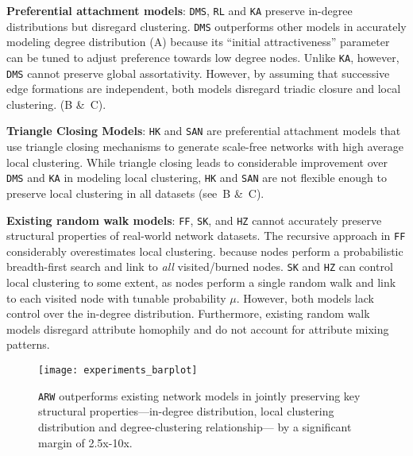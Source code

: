 \textbf{Preferential attachment models}: \texttt{DMS}, \texttt{RL}
and \texttt{KA} preserve in-degree distributions but disregard
clustering. \texttt{DMS} outperforms other models in accurately modeling
degree distribution (A) because its ``initial attractiveness''
parameter can be tuned to adjust preference towards low degree nodes. Unlike \texttt{KA}, however,
\texttt{DMS} cannot preserve global assortativity.
However, by assuming that successive edge formations are independent, both models disregard
triadic closure and local clustering. (B \&~C).

\textbf{Triangle Closing Models}: \texttt{HK} and \texttt{SAN} are preferential attachment models
that use triangle closing mechanisms to generate scale-free networks with high average
local clustering.
While triangle closing leads to considerable improvement over \texttt{DMS}
and \texttt{KA} in modeling local clustering, \texttt{HK} and \texttt{SAN} are not flexible enough
to preserve local clustering in {all} datasets (see~B \&~C).

\textbf{Existing random walk models}: \texttt{FF}, \texttt{SK}, and \texttt{HZ}
cannot accurately preserve structural properties of real-world network datasets.
The recursive approach in \texttt{FF} considerably overestimates local clustering.
because nodes perform a probabilistic breadth-first search and link to \textit{all} visited/burned
nodes.
\texttt{SK} and \texttt{HZ} can control local clustering to some extent, as
nodes perform a single random walk and link to each visited node with tunable probability $\mu$.
However, both models lack control over the in-degree distribution. Furthermore, existing random walk models
disregard attribute homophily and do not account for attribute mixing patterns.

\begin{figure}[b]
	\centering
	\texttt{[image: experiments\_barplot]}
	\label{fig:barplot}
		\caption{\texttt{ARW} outperforms
			existing network models in jointly preserving key structural properties---in-degree
			distribution, local clustering distribution and degree-clustering relationship---
			by a significant margin of 2.5x-10x.
		}
\end{figure}



